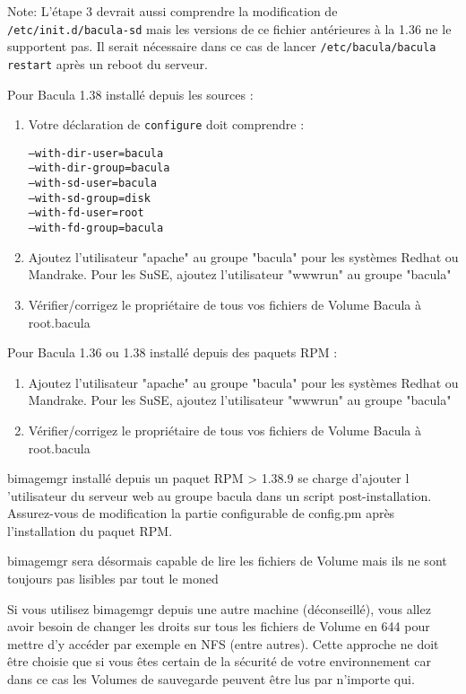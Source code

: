 Note: L'étape 3 devrait aussi comprendre la modification de 
\texttt{/etc/init.d/bacula-sd} mais les versions de ce fichier antérieures à la 
1.36 ne le supportent pas. Il serait nécessaire dans ce cas de lancer 
\texttt{/etc/bacula/bacula restart} après un reboot du serveur.

Pour Bacula 1.38 installé depuis les sources :
\begin{enumerate}
\item Votre déclaration de \texttt{configure} doit comprendre :
\begin{alltt}
    --with-dir-user=bacula
    --with-dir-group=bacula
    --with-sd-user=bacula
    --with-sd-group=disk
    --with-fd-user=root
    --with-fd-group=bacula
\end{alltt}
\item Ajoutez l'utilisateur "apache" au groupe "bacula" pour les systèmes Redhat
    ou Mandrake. Pour les SuSE, ajoutez l'utilisateur "wwwrun" au groupe 
    "bacula"
\item Vérifier/corrigez le propriétaire de tous vos fichiers de Volume Bacula à
    root.bacula
\end{enumerate}

Pour Bacula 1.36 ou 1.38 installé depuis des paquets RPM :
\begin{enumerate}
\item  Ajoutez l'utilisateur "apache" au groupe "bacula" pour les systèmes Redhat
    ou Mandrake. Pour les SuSE, ajoutez l'utilisateur "wwwrun" au groupe 
    "bacula"
\item Vérifier/corrigez le propriétaire de tous vos fichiers de Volume Bacula à
    root.bacula
\end{enumerate}

bimagemgr installé depuis un paquet RPM > 1.38.9 se charge d'ajouter l
'utilisateur du serveur web au groupe bacula dans un script post-installation.
Assurez-vous de modification la partie configurable de config.pm après 
l'installation du paquet RPM.

bimagemgr sera désormais capable de lire les fichiers de Volume mais ils ne sont
toujours pas lisibles par tout le moned

Si vous utilisez bimagemgr depuis une autre machine (déconseillé), vous allez
avoir besoin de changer les droits sur tous les fichiers de Volume en 644
pour mettre d'y accéder par exemple en NFS (entre autres). Cette approche ne
doit être choisie que si vous êtes certain de la sécurité de votre 
environnement car dans ce cas les Volumes de sauvegarde peuvent être lus par
n'importe qui.

